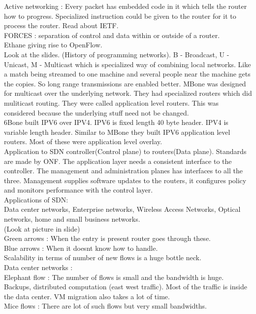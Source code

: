 \documentclass[solution,addpoints,12pt]{exam}
\begin{document}
Active networking : Every packet has embedded code
in it which tells the router how to progress. Specialized
instruction could be given to the router for it to process
the router. Read about IETF.\\

FORCES : separation of control and data within or outside of a router.\\
Ethane giving rise to OpenFlow.\\
Look at the slides. (History of programming networks).
B - Broadcast, U - Unicast,
M - Multicast which is specialized way of combining
local networks. Like a match being streamed to one machine
and several people near the machine gets the copies. So long
range transmissions are enabled better.
MBone was designed for multicast over the underlying network.
They had specialized routers which did muliticast routing. They
were called application level routers. This was considered because
the underlying stuff need not be changed.\\
6Bone built IPV6 over IPV4. IPV6 is fixed length 40 byte header.
IPV4 is variable length header. Similar to MBone
they built IPV6 application level routers. Most of
these were application level overlay.\\

Application to SDN controller(Control plane) to routers(Data plane).
Standards are made by ONF. The application layer needs a consistent
interface to the controller. The management and administration
planes has interfaces to all the three. Management supplies software
updates to the routers, it configures policy and monitors performance
with the control layer.\\

Applications of SDN:\\
Data center networks, Enterprise networks, Wireless Access Networks,
Optical networks, home and small business networks.\\

(Look at picture in slide)\\
Green arrows : When the entry is present router goes through these.\\
Blue arrows : When it doesnt know how to handle.\\
Scalability in terms of number of new flows is a huge bottle neck.\\
Data center networks :\\
Elephant flow : The number of flows is small and the bandwidth is huge.
Backups, distributed computation (east west traffic). Most of
the traffic is inside the data center. VM migration
also takes a lot of time.\\
Mice flows : There are lot of such flows but very small bandwidths.\\
\end{document}
